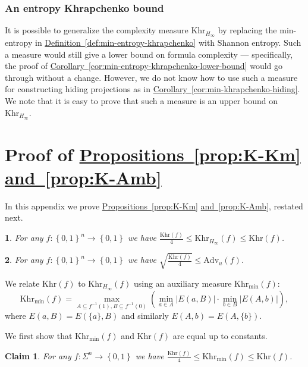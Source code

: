 \documentclass[11pt]{article}
\makeatletter
\numberwithin{equation}{section}
\newtheorem{claim}[theorem]{Claim}
\theoremstyle{definition}
\theoremstyle{plain}
\newcommand{\expref}[2]{\hyperref[#2]{#1~\ref{#2}}}
\theoremstyle{definition}\newtheorem{notation}[theorem]{Notation}\theoremstyle{plain}
\newcommand{\B}{\left\{ 0,1 \right \}}
\newcommand{\Hm}{H_{\infty}}
\newcommand{\K}{\mathrm{Khr}}
\newcommand{\Km}{\K_{\Hm}}
\newcommand{\Kmin}{\K_{\min}}
\newcommand{\Amb}{\mathrm{Adv}_{u}}
\theoremstyle{definition}
\theoremstyle{plain}
\newtheorem*{restated@theorem}{\rep@title}
\newenvironment{restated}[1]{%
	 \def\rep@title{#1}%
	 \begin{restated@theorem}}%
	{\end{restated@theorem}}
\makeatother
\begin{document}
%
%
\subsubsection{An entropy Khrapchenko bound}  %

It is possible to generalize the complexity measure $\Km$ by replacing
the min-entropy in \expref{Definition}{def:min-entropy-khrapchenko} 
with Shannon entropy.
Such a measure would still %
give a lower bound on %
formula complexity --- specifically,
the proof of \expref{Corollary}{cor:min-entropy-khrapchenko-lower-bound} 
would go through
without a change. However, we do not know how to use such a measure
for constructing hiding projections as in 
\expref{Corollary}{cor:min-khrapchenko-hiding}.
We note that it is easy to prove that such a measure is an upper bound
on~$\Km$.

\section{\label{sec:K-Km}Proof of \expref{Propositions}{prop:K-Km}
  \expref{and}{prop:K-Amb}}

In this appendix we prove \expref{Propositions}{prop:K-Km}
  \expref{and}{prop:K-Amb}, restated next. 
\begin{restated}{\expref{Proposition}{prop:K-Km}}
For any $f\colon\B^{n}\to\B$ we have $\tfrac{\K(f)}{4}\le\Km(f)\le\K(f)$. 
\end{restated}

\begin{restated}{\expref{Proposition}{prop:K-Amb}}
For any $f\colon\B^{n}\to\B$ we have $\sqrt{\tfrac{\K(f)}{4}}\le\Amb(f)$. 
\end{restated}

We relate $\K(f)$ to $\Km(f)$ using an auxiliary measure $\Kmin(f)$:
\[
\Kmin(f)=\max_{A\subseteq f^{-1}(1),B\subseteq f^{-1}(0)}\left(\min_{a\in A}{|E(a,B)|}\cdot\min_{b\in B}{|E(A,b)|}\right),
\]
where $E(a,B)=E(\{a\},B)$ and similarly $E(A,b)=E(A,\{b\})$.

We first show that $\Kmin(f)$ and $\K(f)$ are equal up to constants.
\begin{claim}
\label{claim:K-Kmin} For any $f\colon\Sigma^{n}\to\B$ we have $\tfrac{\K(f)}{4}\le\Kmin(f)\le\K(f)$. 
\end{claim}
\end{document}
